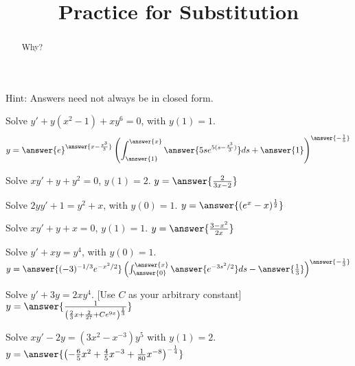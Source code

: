 \documentclass{ximera}
\title{Practice for Substitution}
\begin{document}
\begin{abstract}
    Why?
\end{abstract}
\maketitle

Hint: Answers need not always be in closed form.

\begin{exercise}
    Solve $y'+ y(x^2-1)+xy^6 = 0$, with $y(1)=1$. 
    \[
        y = \answer{e}^{\answer{x - \frac{x^3}{3}}}\left(\int_{\answer{1}}^{\answer{x}} \answer{5se^{5(s - \frac{s^3}{3})}} ds + \answer{1} \right)^{\answer{-\frac{1}{5}}}
    \]
\end{exercise}

\begin{exercise}%
    Solve $xy'+y+y^2 = 0$, $y(1)=2$. $y = \answer{\frac{2}{3x-2}}$
\end{exercise}

\begin{exercise}
    Solve $2yy' + 1 = y^2 + x$, with $y(0)=1$. $y = \answer{(e^x - x)^{\frac{1}{2}}}$
\end{exercise}

\begin{exercise}%
    Solve $xy'+y +x = 0$, $y(1)=1$. $y = \answer{\frac{3-x^2}{2 x}}$
\end{exercise}

\begin{exercise}
    Solve $y' + xy = y^4$, with $y(0)=1$. $y = \answer{(-3)^{-1/3}e^{-x^2/2}}\left(\int_{\answer{0}}^{\answer{x}} \answer{e^{-3s^2/2}} ds - \answer{\frac{1}{3}} \right)^{\answer{-\frac{1}{3}}}$
\end{exercise}

\begin{exercise}
    Solve $y' + 3y = 2xy^4$. [Use $C$ as your arbitrary constant] $y = \answer{\frac{1}{\left( \frac{2}{3}x + \frac{2}{27} + Ce^{9x}\right)^{\frac{1}{3}}}}$
\end{exercise}

\begin{exercise}
    Solve $xy' - 2y = (3x^2 - x^{-3})y^5$ with $y(1) = 2$. $y = \answer{\left(-\frac{6}{5}x^2 + \frac{4}{5}x^{-3} + \frac{1}{80}x^{-8} \right)^{-\frac{1}{4}}}$
\end{exercise}
\end{document}

